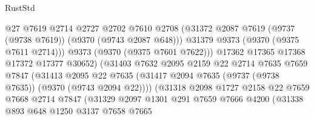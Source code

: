 \begin{lexlean}{RustStd}
\begin{coremodule}
                                  @27
                                  @7619
                                  @2714
                                  @2727
                                  @2702
                                  @7610
                                  @2708
                                  (@31372
                                    @2087
                                    @7619
                                    (@9737 (@9738 @7619))
                                    (@9370 (@9743 @2087 @648)))
                                  @31379
                                  @9373
                                  (@9370 (@9375 @7611 @2714)))
                                @9373
                                (@9370 (@9375 @7601 @7622)))
                              @17362
                              @17365
                              @17368
                              @17372
                              @17377
                              @30652)
                            (@31403
                              @7632
                              @2095
                              @2159
                              @22
                              @2714
                              @7635
                              @7659
                              @7847
                              (@31413
                                @2095
                                @22
                                @7635
                                (@31417
                                  @2094
                                  @7635
                                  (@9737 (@9738 @7635))
                                  (@9370 (@9743 @2094 @22))))
                              (@31318
                                @2098
                                @1727
                                @2158
                                @22
                                @7659
                                @7668
                                @2714
                                @7847
                                (@31329
                                  @2097
                                  @1301
                                  @291
                                  @7659
                                  @7666
                                  @4200
                                  (@31338
                                    @893
                                    @648
                                    @1250
                                    @3137
                                    @7658
                                    @7665

\end{coremodule}
\end{lexlean}
